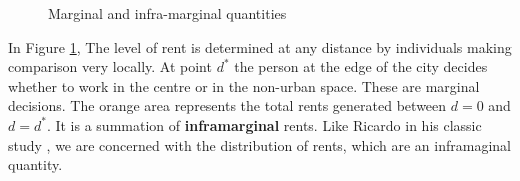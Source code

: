 \begin{figure}[h!t!]
    \centering
   \caption{Marginal and infra-marginal quantities}
    \label{fig:landrentasinframarginal}
\end{figure}


In Figure \ref{fig:landrentasinframarginal}, The level of rent is determined at any distance by individuals making comparison very locally. At point $d^*$ the person at the edge of the city decides whether to work in the centre or in the non-urban space. These are \gls{marginal} decisions. The orange area represents  the total rents generated between $d=0$ and $d=d^*$. It is a summation of \textbf{\gls{inframarginal}} rents. Like Ricardo in his classic study \cite{ricardoEssayInfluenceLow1815}, we are concerned with the distribution of rents, which are an  inframaginal quantity.




